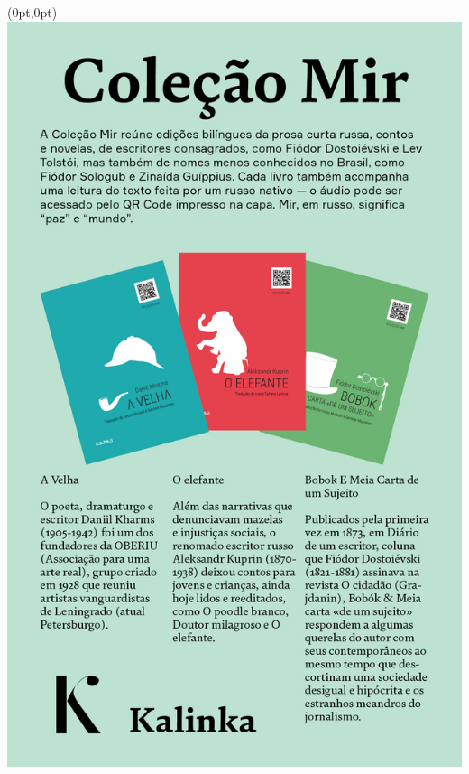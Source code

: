 \pagestyle{kalinka}
\label{kalinka}

\begin{textblock*}{5.625in}(0pt,0pt)%
\vspace*{-2.35cm}
\hspace*{-1.65cm}\includegraphics*[width=160mm]{./imgs/KALINKA.png}
\end{textblock*}

\pagebreak %

\hspace{.5cm}

